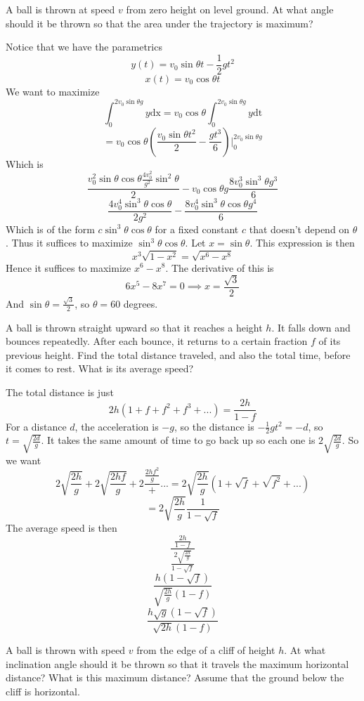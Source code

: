 \documentclass[11pt]{scrartcl}
\newcommand{\ca}[1]{\mathrm{#1}}
\begin{document}
\begin{example}
  [3.14]
  A ball is thrown at speed $v$ from zero height on level ground.
  At what angle should it be thrown so that the area
  under the trajectory is maximum?
\end{example}
\begin{soln}
  Notice that we have the parametrics
  $$y(t)=v_0\sin\theta t-\frac{1}{2}gt^2$$
  $$x(t)=v_0\cos\theta t$$
  We want to maximize
  $$\int_0^{2v_0\sin\theta g}y\ca{dx}=v_0\cos\theta\int_0^{2v_0\sin\theta g}y\ca{dt}$$
  $$=v_0\cos\theta\left(\frac{v_0\sin\theta t^2}{2}-\frac{gt^3}{6}\right)\Big|_{0}^{2v_0\sin\theta g}$$
  Which is
  $$\frac{v_0^2\sin\theta\cos\theta \frac{4v_0^2}{g^2}\sin^2\theta}{2}-v_0\cos\theta g\frac{8v_0^3\sin^3\theta g^3}{6}$$
  $$\frac{4v_0^4\sin^3\theta\cos\theta}{2g^2}-\frac{8v_0^4\sin^3\theta\cos\theta g^4}{6}$$
  Which is of the form $c\sin^3\theta\cos\theta$ for a fixed constant $c$ that doesn't
  depend on $\theta$. Thus it suffices to maximize $\sin^3\theta\cos\theta$.
  Let $x=\sin\theta$. This expression is then
  $$x^3\sqrt{1-x^2}=\sqrt{x^6-x^8}$$
  Hence it suffices to maximize $x^6-x^8$. The derivative of this is
  $$6x^5-8x^7=0\implies x=\frac{\sqrt{3}}{2}$$
  And $\sin\theta=\frac{\sqrt{3}}{2}$, so $\theta=60$ degrees.
\end{soln}
\begin{example}
  [3.15]
  A ball is thrown straight upward so that it reaches a height $h$.
  It falls down and bounces repeatedly. After each bounce, it returns to
  a certain fraction $f$ of its previous height. Find the total
  distance traveled, and also the total time, before it comes to rest.
  What is its average speed?
\end{example}
\begin{soln}
  The total distance is just
  $$2h(1+f+f^2+f^3+...)=\frac{2h}{1-f}$$
  For a distance $d$, the acceleration is $-g$, so the distance is $-\frac{1}{2}gt^2=-d$, so $t=\sqrt{\frac{2d}{g}}$.
  It takes the same amount of time to go back up so each one is $2\sqrt{\frac{2d}{g}}$. So we want
  $$2\sqrt{\frac{2h}{g}}+2\sqrt{\frac{2hf}{g}}+2\frac{\frac{2hf^2}{g}}+...=2\sqrt{\frac{2h}{g}}\left(1+\sqrt{f}+\sqrt{f^2}+...\right)$$
  $$=2\sqrt{\frac{2h}{g}}\frac{1}{1-\sqrt{f}}$$
  The average speed is then
  $$\frac{\frac{2h}{1-f}}{\frac{2\sqrt{\frac{2h}{g}}}{1-\sqrt{f}}}$$
  $$\frac{h(1-\sqrt{f})}{\sqrt{\frac{2h}{g}}(1-f)}$$
  $$\frac{h\sqrt{g}(1-\sqrt{f})}{\sqrt{2h}(1-f)}$$
\end{soln}
\begin{example}
  [3.17]
  A ball is thrown with speed $v$ from the edge of a cliff of height $h$.
  At what inclination angle should it be thrown so that it travels
  the maximum horizontal distance? What is this maximum distance?
  Assume that the ground below the cliff is horizontal.
\end{example}
\end{document}
